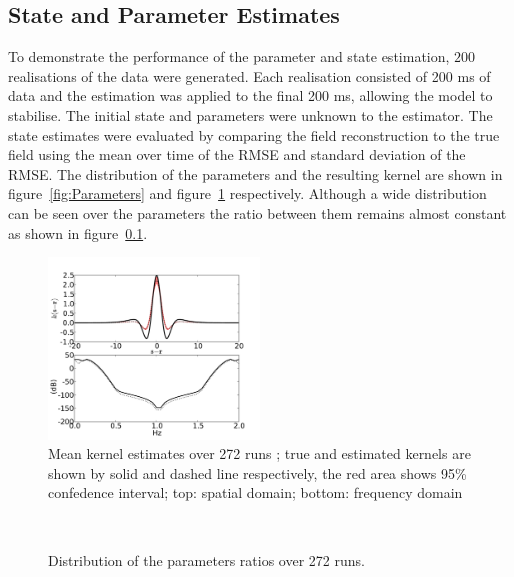 \documentclass[twocolumn,11pt,a4paper]{article}		%
\begin{document}
\subsection{State and Parameter Estimates} To demonstrate the performance of the parameter and state estimation, $200$ realisations of the data were generated. Each realisation consisted of 200 ms of data and the estimation was applied to the final 200 ms, allowing the model to stabilise. The initial state and parameters were unknown to the estimator. The state estimates were evaluated by comparing the field reconstruction to the true field using the mean over time of the RMSE and standard deviation of the RMSE. The distribution of the parameters and the resulting kernel are shown in figure~\ref{fig:Parameters} and figure~\ref{fig:KernelEstimates} respectively. Although a wide distribution can be seen over the parameters the ratio between them remains almost constant as shown in figure~\ref{}.
\begin{figure}
\includegraphics[width=0.5\textwidth]{./Graph/KernelEstimate_KernelFreqResponse.pdf}
\caption{Mean kernel estimates over 272 runs ;  true and estimated kernels are shown by solid
and dashed line respectively, the red area shows 95\% confedence interval; top: spatial domain; bottom: frequency domain}
\label{fig:KernelEstimates}
\end{figure}
\begin{figure}[th]
\\
\caption{Distribution of the parameters ratios over 272 runs.}
\label{fig:ParametersRatio}
\end{figure}
\end{document}
